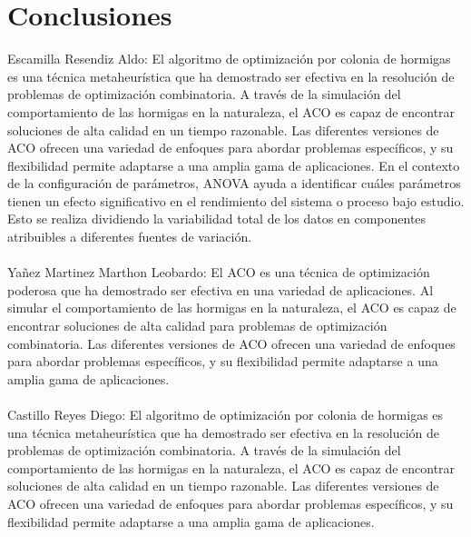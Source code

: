 \documentclass{report}
\begin{document}
\section{Conclusiones}
Escamilla Resendiz Aldo:
El algoritmo de optimización por colonia de hormigas es una técnica metaheurística que ha demostrado ser efectiva en la resolución de problemas de optimización combinatoria. A través de la simulación del comportamiento de las hormigas en la naturaleza, el ACO es capaz de encontrar soluciones de alta calidad en un tiempo razonable. Las diferentes versiones de ACO ofrecen una variedad de enfoques para abordar problemas específicos, y su flexibilidad permite adaptarse a una amplia gama de aplicaciones.
En el contexto de la configuración de parámetros, ANOVA ayuda a identificar cuáles parámetros tienen un efecto significativo en el rendimiento del sistema o proceso bajo estudio. Esto se realiza dividiendo la variabilidad total de los datos en componentes atribuibles a diferentes fuentes de variación.\\
\\Yañez Martinez Marthon Leobardo:
El ACO es una técnica de optimización poderosa que ha demostrado ser efectiva en una variedad de aplicaciones. Al simular el comportamiento de las hormigas en la naturaleza, el ACO es capaz de encontrar soluciones de alta calidad para problemas de optimización combinatoria. Las diferentes versiones de ACO ofrecen una variedad de enfoques para abordar problemas específicos, y su flexibilidad permite adaptarse a una amplia gama de aplicaciones.\\
\\Castillo Reyes Diego:
El algoritmo de optimización por colonia de hormigas es una técnica metaheurística que ha demostrado ser efectiva en la resolución de problemas de optimización combinatoria. A través de la simulación del comportamiento de las hormigas en la naturaleza, el ACO es capaz de encontrar soluciones de alta calidad en un tiempo razonable. Las diferentes versiones de ACO ofrecen una variedad de enfoques para abordar problemas específicos, y su flexibilidad permite adaptarse a una amplia gama de aplicaciones.
\end{document}
